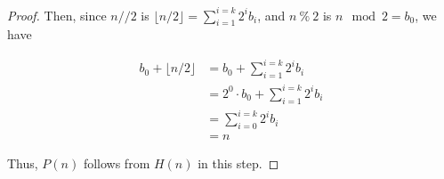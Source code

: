 \documentclass[12pt]{article}
\begin{document}
\begin{itemize}
\begin{proof}
    \bigskip

    Then, since $n // 2$ is $\lfloor n/2 \rfloor = \sum\limits_{i=1}^{i=k} 2^ib_i$,
    and $n\:\%\:2$ is $n \mod 2 = b_0$, we have

    \begin{align}
        b_0 + \lfloor n/2 \rfloor &= b_0 + \sum\limits_{i=1}^{i=k} 2^ib_i\\
        &= 2^0 \cdot b_0 + \sum\limits_{i=1}^{i=k} 2^ib_i\\
        &= \sum\limits_{i=0}^{i=k} 2^ib_i\\
        &= n
    \end{align}

    Thus, $P(n)$ follows from $H(n)$ in this step.

    \end{proof}














\end{itemize}
\end{document}
